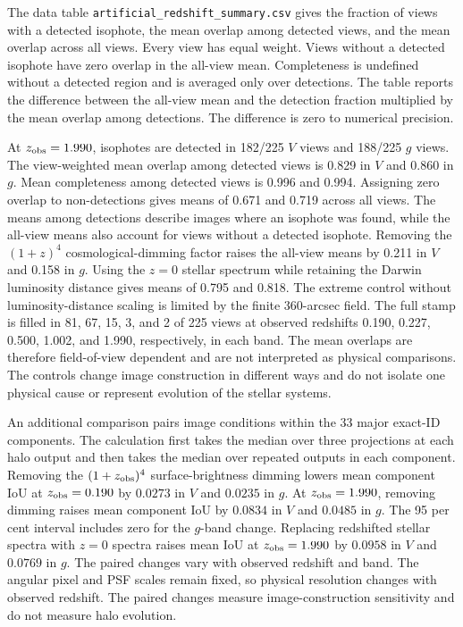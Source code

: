 \documentclass[usenatbib]{mnras}
\begin{document}
The data table \texttt{artificial\_redshift\_summary.csv} gives the fraction
of views with a detected isophote, the mean overlap among detected views,
and the mean overlap across all views. Every view has equal weight. Views
without a detected isophote have zero overlap in the all-view mean.
Completeness is undefined without a detected region and is averaged only over
detections. The table reports the difference between the all-view mean and
the detection fraction multiplied by the mean overlap among detections.
The difference is zero to numerical precision.

At $z_{\rm obs}=1.990$, isophotes are detected in 182/225 $V$ views and
188/225 $g$ views. The view-weighted mean overlap among detected views is
0.829 in $V$ and 0.860 in $g$. Mean completeness among detected views is
0.996 and 0.994. Assigning zero overlap to non-detections gives means of
0.671 and 0.719 across all views. The means among detections describe
images where an isophote was found, while the all-view means also account
for views without a detected isophote. Removing the $(1+z)^4$ cosmological-dimming factor raises the
all-view means by 0.211 in $V$ and 0.158 in $g$. Using the $z=0$ stellar
spectrum while retaining the Darwin luminosity distance gives means of
0.795 and 0.818. The extreme control without luminosity-distance scaling is limited by
the finite 360-arcsec field. The full stamp is filled in 81, 67, 15, 3,
and 2 of 225 views at observed redshifts 0.190, 0.227, 0.500, 1.002,
and 1.990, respectively, in each band. The mean overlaps are therefore
field-of-view dependent and are not interpreted as physical comparisons.
The controls change image construction in different ways and do not
isolate one physical cause or represent evolution of the stellar systems.

An additional comparison pairs image conditions within the 33 major exact-ID
components. The calculation first takes the median over three projections at
each halo output and then takes the median over repeated outputs in each
component. Removing the $(1+z_{\rm obs})^4$ surface-brightness dimming lowers
mean component IoU at $z_{\rm obs}=0.190$ by $0.0273$ in $V$ and $0.0235$ in
$g$. At $z_{\rm obs}=1.990$, removing dimming raises mean component IoU by
$0.0834$ in $V$ and $0.0485$ in $g$. The 95 per cent interval includes zero
for the $g$-band change. Replacing redshifted stellar spectra with $z=0$
spectra raises mean IoU at $z_{\rm obs}=1.990$ by $0.0958$ in $V$ and
$0.0769$ in $g$. The paired changes vary with observed redshift and band.
The angular pixel and PSF scales remain fixed, so physical resolution changes
with observed redshift. The paired changes measure image-construction
sensitivity and do not measure halo evolution.
\end{document}
